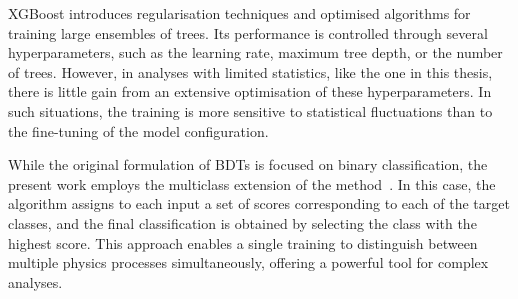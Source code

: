 XGBoost introduces regularisation techniques and optimised algorithms for training large ensembles of trees. Its performance is controlled through several hyperparameters, such as the learning rate, maximum tree depth, or the number of trees. However, in analyses with limited statistics, like the one in this thesis, there is little gain from an extensive optimisation of these hyperparameters. In such situations, the training is more sensitive to statistical fluctuations than to the fine-tuning of the model configuration.

While the original formulation of BDTs is focused on binary classification, the present work employs the multiclass extension of the method~\cite{tmvatoolkit}. In this case, the algorithm assigns to each input a set of scores corresponding to each of the target classes, and the final classification is obtained by selecting the class with the highest score. This approach enables a single training to distinguish between multiple physics processes simultaneously, offering a powerful tool for complex analyses.




